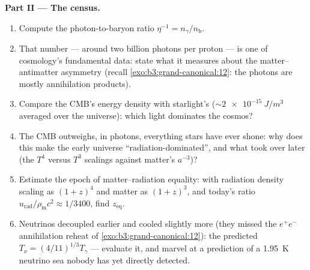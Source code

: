 \begin{problem}
\medskip\noindent\textbf{Part II --- The census.}
\begin{enumerate}[resume]
  \item Compute the photon-to-baryon ratio $\eta^{-1} =
        n_\gamma/n_{\text{b}}$.
  \item That number --- around two billion photons per proton ---
        is one of cosmology's fundamental data: state what it
        measures about the matter--antimatter asymmetry (recall
        \cref{exo:b3:grand-canonical:12}: the photons are mostly
        annihilation products).
  \item Compare the CMB's energy density with starlight's
        ($\sim\qty{2e-15}{J/m^3}$ averaged over the universe):
        which light dominates the cosmos?
  \item The CMB outweighs, in photons, everything stars have ever
        shone: why does this make the early universe
        ``radiation-dominated'', and what took over later (the
        $T^4$ versus $T^3$ scalings against matter's $a^{-3}$)?
  \item Estimate the epoch of matter--radiation equality: with
        radiation density scaling as $(1+z)^4$ and matter as
        $(1+z)^3$, and today's ratio
        $u_{\text{rad}}/\rho_{\text{m}}c^2 \approx 1/3400$, find
        $z_{\text{eq}}$.
  \item Neutrinos decoupled earlier and cooled slightly more
        (they missed the $e^+e^-$ annihilation reheat of
        \cref{exo:b3:grand-canonical:12}): the predicted
        $T_\nu = (4/11)^{1/3}T_\gamma$ --- evaluate it, and
        marvel at a prediction of a \qty{1.95}{K} neutrino sea
        nobody has yet directly detected.
\end{enumerate}


\end{problem}
